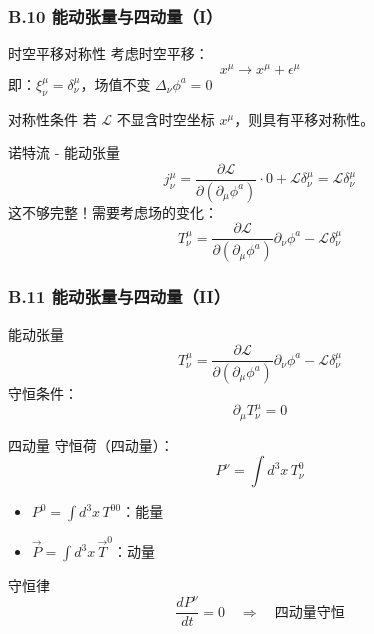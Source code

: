 \documentclass[xcolor=dvipsnames]{ctexbeamer}
\begin{document}
\begin{frame}
\frametitle{B.10 能动张量与四动量（I）}
\begin{block}{时空平移对称性}
考虑时空平移：
$$x^\mu \to x^\mu + \epsilon^\mu$$
即：$\xi^\mu_\nu = \delta^\mu_\nu$，场值不变 $\Delta_\nu\phi^a = 0$
\end{block}

\pause

\begin{block}{对称性条件}
若 $\mathcal{L}$ 不显含时空坐标 $x^\mu$，则具有平移对称性。
\end{block}

\pause

\begin{block}{诺特流 - 能动张量}
$$j^\mu_\nu = \frac{\partial\mathcal{L}}{\partial(\partial_\mu\phi^a)} \cdot 0 + \mathcal{L}\delta^\mu_\nu = \mathcal{L}\delta^\mu_\nu$$
这不够完整！需要考虑场的变化：
$$T^\mu_\nu = \frac{\partial\mathcal{L}}{\partial(\partial_\mu\phi^a)}\partial_\nu\phi^a - \mathcal{L}\delta^\mu_\nu$$
\end{block}
\end{frame}

\begin{frame}
\frametitle{B.11 能动张量与四动量（II）}
\begin{block}{能动张量}
$$\boxed{T^\mu_\nu = \frac{\partial\mathcal{L}}{\partial(\partial_\mu\phi^a)}\partial_\nu\phi^a - \mathcal{L}\delta^\mu_\nu}$$
守恒条件：
$$\partial_\mu T^\mu_\nu = 0$$
\end{block}

\pause

\begin{block}{四动量}
守恒荷（四动量）：
$$P^\nu = \int d^3x \, T^0_\nu$$
\begin{itemize}
\item $P^0 = \int d^3x \, T^{00}$：能量
\item $\vec{P} = \int d^3x \, \vec{T}^0$：动量
\end{itemize}
\end{block}

\pause

\begin{alertblock}{守恒律}
$$\frac{dP^\nu}{dt} = 0 \quad \Rightarrow \quad \text{四动量守恒}$$
\end{alertblock}
\end{frame}
\end{document}
